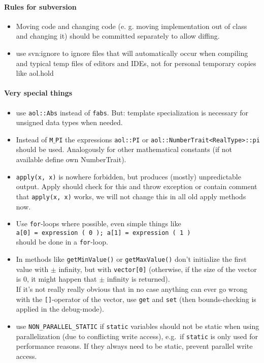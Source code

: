 \paragraph{Rules for subversion}

\begin{itemize}
  \item Moving code and changing code (e. g. moving implementation out of class and changing it)
        should be committed separately to allow diffing.
  \item use svn:ignore to ignore files that will automatically occur when compiling and typical temp files of editors and IDEs,
        not for personal temporary copies like aol.hold
\end{itemize}


\paragraph{Very special things}
\begin{itemize}
  \item use \texttt{aol::Abs} instead of \texttt{fabs}.
        But: template specialization is necessary for unsigned data types when needed.
  \item Instead of \texttt{M$\_$PI} the expressions \texttt{aol::PI} or
        \texttt{aol::NumberTrait<RealType>::pi} should be used. Analogously for other mathematical
        constants (if not available define own NumberTrait).
  \item \texttt{apply(x, x)} is nowhere forbidden, but produces (mostly) unpredictable output.
        Apply should check for this and throw exception or contain comment that \texttt{apply(x, x)}
        works, we will not change this in all old apply methods now.
  \item Use \texttt{for}-loops where possible, even simple things like \\
        \texttt{a[0] = expression ( 0 ); a[1] = expression ( 1 )} \\
        should be done in a \texttt{for}-loop.
  \item In methods like \texttt{getMinValue()} or \texttt{getMaxValue()} don't initialize the
        first value with $\pm$ infinity, but with \texttt{vector[0]} (otherwise, if the size of
        the vector is $0$, it might happen that $\pm$ infinity is returned). \\
        If it's not really really obvious that in no case anything can ever go wrong with the
        \texttt{[]}-operator of the vector, use \texttt{get} and \texttt{set} (then bounds-checking
        is applied in the debug-mode).
  \item use \texttt{NON\_PARALLEL\_STATIC} if \texttt{static} variables should not be static when using
        parallelization (due to conflicting write access), e.g.\ if \texttt{static} is only used for
        performance reasons. If they always need to be static, prevent parallel write access.
\end{itemize}


